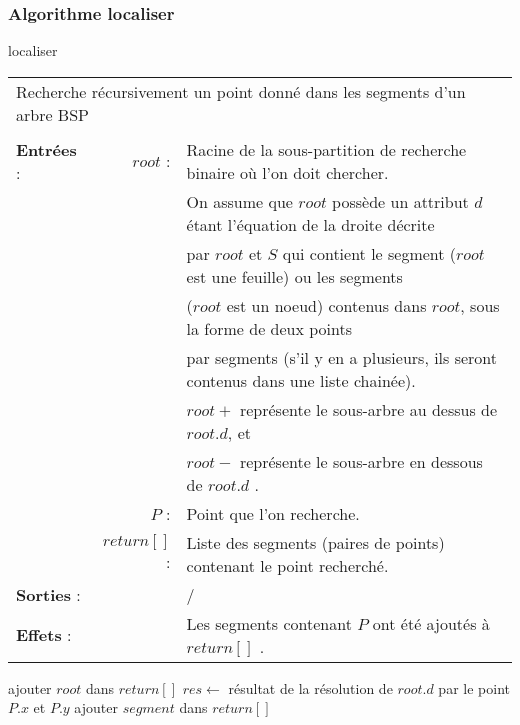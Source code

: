 \documentclass[10pt]{article}
\begin{document}
\subsubsection{Algorithme localiser}
\begin{algorithm}[H]
\caption{localiser}
\begin{tabular}{lrl}
\multicolumn{3}{l}{Recherche récursivement un point donné dans les segments d'un arbre BSP}\\
&&\\
\textbf{Entrées} : &$root$ : &Racine de la sous-partition de recherche binaire où l'on doit chercher.\\
&&On assume que $root$ possède un attribut $d$ étant l'équation de la droite décrite\\
&&par $root$ et $S$ qui contient le segment ($root$ est une feuille) ou les segments\\
&&($root$ est un noeud) contenus dans $root$, sous la forme de deux points\\
&& par segments (s'il y en a plusieurs, ils seront contenus dans une liste chainée).\\
&&$root+$ représente le sous-arbre au dessus de $root.d$, et\\
&&$root-$ représente le sous-arbre en dessous de $root.d$ .\\
&$P$ :&Point que l'on recherche.\\
&$return[]$ :&Liste des segments (paires de points) contenant le point recherché.\\
\textbf{Sorties} :& &/\\
\textbf{Effets} :& &Les segments contenant $P$ ont été ajoutés à $return[]$ .
\end{tabular}
\begin{algorithmic}[1]
\State ajouter $root$ dans $return[]$
\EndIf
\Else
\State $res\gets$ résultat de la résolution de $root.d$ par le point $P.x$ et $P.y$
\State {}
\State {}
\Else
{}
\State ajouter $segment$ dans $return[]$
\EndIf
\EndFor
\State{}
\State{}
\EndIf
\EndIf
\EndProcedure
\end{algorithmic}
\end{algorithm}
\end{document}
